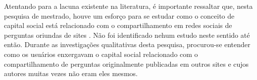 Atentando para a lacuna existente na literatura, é importante ressaltar que, nesta pesquisa de mestrado, houve um esforço para se estudar como o conceito de capital social está relacionado com o compartilhamento em redes sociais de perguntas oriundas de sites \qanospace. Não foi identificado nehum estudo neste sentido até então. Durante as investigações qualitativas desta pesquisa, procurou-se entender como os usuários enxergavam o capital social relacionado com o compartilhamento de perguntas originalmente publicadas em outros sites e cujos autores muitas vezes não eram eles mesmos.